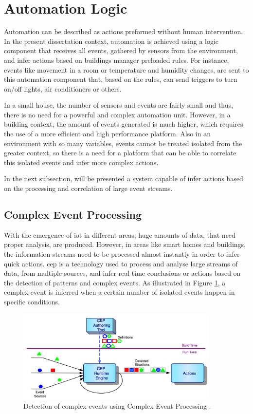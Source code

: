 \section{Automation Logic}
Automation can be described as actions preformed without human intervention. In the present dissertation context, automation is achieved using a logic component that receives all events, gathered by sensors from the environment, and infer actions based on buildings manager preloaded rules. For instance, events like movement in a room or temperature and humidity changes, are sent to this automation component that, based on the rules, can send triggers to turn on/off lights, air conditioners or others.

In a small house, the number of sensors and events are fairly small and thus, there is no need for a powerful and complex automation unit. However, in a building context, the amount of events generated is much higher, which requires the use of a more efficient and high performance platform. Also in an environment with so many variables, events cannot be treated isolated from the greater context, so there is a need for a platform that can be able to correlate this isolated events and infer more complex actions.

In the next subsection, will be presented a system capable of infer actions based on the processing and correlation of large event streams.

\subsection{Complex Event Processing}

With the emergence of \ac{iot} in different areas, huge amounts of data, that need proper analysis, are produced. However, in areas like smart homes and buildings, the information streams need to be processed almost instantly in order to infer quick actions. \acf{cep} is a technology used to process and analyse large streams of data, from multiple sources, and infer real-time conclusions or actions based on the detection of patterns and complex events. As illustrated in Figure \ref{fig:cep}, a complex event is inferred when a certain number of isolated events happen in specific conditions.  


\begin{figure}[H]
	\centering
	\includegraphics[width=0.9\textwidth]{figures/cep1.png}
	\caption{Detection of complex events using Complex Event Processing \cite{Pooja2015}.}
	\label{fig:cep}
\end{figure}


